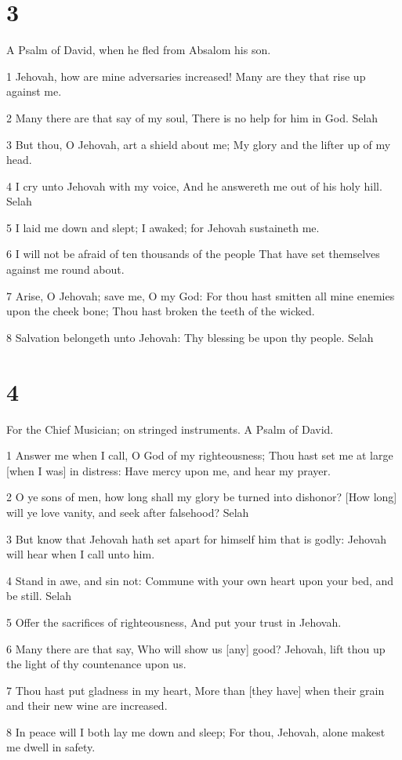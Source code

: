 \chapter{3}

\par A Psalm of David, when he fled from Absalom his son.

\par 1 Jehovah, how are mine adversaries increased! Many are they that rise up against me.
\par 2 Many there are that say of my soul, There is no help for him in God. Selah
\par 3 But thou, O Jehovah, art a shield about me; My glory and the lifter up of my head.
\par 4 I cry unto Jehovah with my voice, And he answereth me out of his holy hill. Selah
\par 5 I laid me down and slept; I awaked; for Jehovah sustaineth me.
\par 6 I will not be afraid of ten thousands of the people That have set themselves against me round about.
\par 7 Arise, O Jehovah; save me, O my God: For thou hast smitten all mine enemies upon the cheek bone; Thou hast broken the teeth of the wicked.
\par 8 Salvation belongeth unto Jehovah: Thy blessing be upon thy people. Selah

\chapter{4}

\par For the Chief Musician; on stringed instruments. A Psalm of David.

\par 1 Answer me when I call, O God of my righteousness; Thou hast set me at large [when I was] in distress: Have mercy upon me, and hear my prayer.
\par 2 O ye sons of men, how long shall my glory be turned into dishonor? [How long] will ye love vanity, and seek after falsehood? Selah
\par 3 But know that Jehovah hath set apart for himself him that is godly: Jehovah will hear when I call unto him.
\par 4 Stand in awe, and sin not: Commune with your own heart upon your bed, and be still. Selah
\par 5 Offer the sacrifices of righteousness, And put your trust in Jehovah.
\par 6 Many there are that say, Who will show us [any] good? Jehovah, lift thou up the light of thy countenance upon us.
\par 7 Thou hast put gladness in my heart, More than [they have] when their grain and their new wine are increased.
\par 8 In peace will I both lay me down and sleep; For thou, Jehovah, alone makest me dwell in safety.

